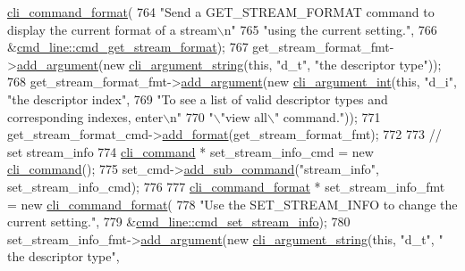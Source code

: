 \begin{DoxyCode}
      \hyperlink{classcli__command__format}{cli\_command\_format}(
764         \textcolor{stringliteral}{"Send a GET\_STREAM\_FORMAT command to display the current format of a stream\(\backslash\)n"}
765         \textcolor{stringliteral}{"using the current setting."},
766         &\hyperlink{classcmd__line_a481f4151d6ba2898953c8757298f55ce}{cmd\_line::cmd\_get\_stream\_format});
767     get\_stream\_format\_fmt->\hyperlink{classcli__command__format_ac3fc6d13a227c195d5ee6f7b78eba9cd}{add\_argument}(\textcolor{keyword}{new} \hyperlink{classcli__argument__string}{cli\_argument\_string}(\textcolor{keyword}{this}, \textcolor{stringliteral}{"d\_t"},
       \textcolor{stringliteral}{"the descriptor type"}));
768     get\_stream\_format\_fmt->\hyperlink{classcli__command__format_ac3fc6d13a227c195d5ee6f7b78eba9cd}{add\_argument}(\textcolor{keyword}{new} \hyperlink{classcli__argument__int}{cli\_argument\_int}(\textcolor{keyword}{this}, \textcolor{stringliteral}{"d\_i"}, \textcolor{stringliteral}{"the
       descriptor index"},
769                                                              \textcolor{stringliteral}{"To see a list of valid descriptor types and
       corresponding indexes, enter\(\backslash\)n"}
770                                                              \textcolor{stringliteral}{"\(\backslash\)"view all\(\backslash\)" command."}));
771     get\_stream\_format\_cmd->\hyperlink{classcli__command_aa9ec38e761644d946f8db2b920e39921}{add\_format}(get\_stream\_format\_fmt);
772 
773     \textcolor{comment}{// set stream\_info}
774     \hyperlink{classcli__command}{cli\_command} * set\_stream\_info\_cmd = \textcolor{keyword}{new} \hyperlink{classcli__command}{cli\_command}();
775     set\_cmd->\hyperlink{classcli__command_aa73a67e8ebb6facd4b40ced66279b226}{add\_sub\_command}(\textcolor{stringliteral}{"stream\_info"}, set\_stream\_info\_cmd);
776 
777     \hyperlink{classcli__command__format}{cli\_command\_format} * set\_stream\_info\_fmt = \textcolor{keyword}{new} 
      \hyperlink{classcli__command__format}{cli\_command\_format}(
778         \textcolor{stringliteral}{"Use the SET\_STREAM\_INFO to change the current setting."},
779         &\hyperlink{classcmd__line_ab0e730e5b0378ee260dea25ba8eed459}{cmd\_line::cmd\_set\_stream\_info});
780     set\_stream\_info\_fmt->\hyperlink{classcli__command__format_ac3fc6d13a227c195d5ee6f7b78eba9cd}{add\_argument}(\textcolor{keyword}{new} \hyperlink{classcli__argument__string}{cli\_argument\_string}(\textcolor{keyword}{this}, \textcolor{stringliteral}{"d\_t"}, \textcolor{stringliteral}{"
      the descriptor type"},

\end{DoxyCode}

